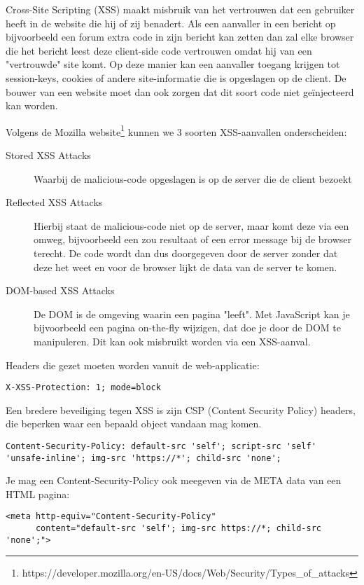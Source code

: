 Cross-Site Scripting (XSS) maakt misbruik van het vertrouwen dat een gebruiker heeft in de website die hij of zij benadert. Als een aanvaller in een bericht op bijvoorbeeld een forum extra code in zijn bericht kan zetten dan zal elke browser die het bericht leest deze client-side code vertrouwen omdat hij van een "vertrouwde" site komt. Op deze manier kan een aanvaller toegang krijgen tot session-keys, cookies of andere site-informatie die is opgeslagen op de client. De bouwer van een website moet dan ook zorgen dat dit soort code niet ge\"injecteerd kan worden.

Volgens de Mozilla website\footnote{https://developer.mozilla.org/en-US/docs/Web/Security/Types\_of\_attacks} kunnen we 3 soorten XSS-aanvallen onderscheiden:
\begin{description}
	\item[Stored XSS Attacks] Waarbij de malicious-code opgeslagen is op de server die de client bezoekt
	\item[Reflected XSS Attacks] Hierbij staat de malicious-code niet op de server, maar komt deze via een omweg, bijvoorbeeld een zou resultaat of een error message bij de browser terecht. De code wordt dan dus doorgegeven door de server zonder dat deze het weet en voor de browser lijkt de data van de server te komen.
	\item[DOM-based XSS Attacks] De DOM is de omgeving waarin een pagina "leeft". Met JavaScript kan je bijvoorbeeld een pagina on-the-fly wijzigen, dat doe je door de DOM te manipuleren. Dit kan ook misbruikt worden via een XSS-aanval.
\end{description}

Headers die gezet moeten worden vanuit de web-applicatie:
\begin{lstlisting}
X-XSS-Protection: 1; mode=block
\end{lstlisting}

Een bredere beveiliging tegen XSS is zijn CSP (Content Security Policy) headers, die beperken waar een bepaald object vandaan mag komen.
\begin{lstlisting}
Content-Security-Policy: default-src 'self'; script-src 'self' 'unsafe-inline'; img-src 'https://*'; child-src 'none';
\end{lstlisting}
Je mag een Content-Security-Policy ook meegeven via de META data van een HTML pagina:
\begin{lstlisting}
<meta http-equiv="Content-Security-Policy"
      content="default-src 'self'; img-src https://*; child-src 'none';">
\end{lstlisting}

